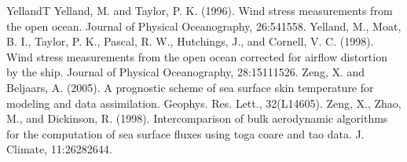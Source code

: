 \documentclass[letterpaper,10pt,english]{sphinxmanual}
\begin{document}
\begin{sphinxthebibliography}{YellandT}
\sphinxAtStartPar
Yelland, M. and Taylor, P. K. (1996). Wind stress measurements from the open ocean. Journal of Physical Oceanography, 26:541\textendash{}558.
\sphinxAtStartPar
Yelland, M., Moat, B. I., Taylor, P. K., Pascal, R. W., Hutchings, J., and Cornell, V. C. (1998). Wind stress measurements from the open ocean corrected for airflow distortion by the ship. Journal of Physical Oceanography, 28:1511\textendash{}1526.
\sphinxAtStartPar
Zeng, X. and Beljaars, A. (2005). A prognostic scheme of sea surface skin temperature for modeling and data assimilation. Geophys. Res. Lett., 32(L14605).
\sphinxAtStartPar
Zeng, X., Zhao, M., and Dickinson, R. (1998). Intercomparison of bulk aerodynamic algorithms for the computation of sea surface fluxes using toga coare and tao data. J. Climate, 11:2628\textendash{}2644.
\end{sphinxthebibliography}


\renewcommand{\indexname}{Python Module Index}
\begin{sphinxtheindex}
\let\bigletter\sphinxstyleindexlettergroup
\bigletter{a}
\item\relax{}
\indexspace
\bigletter{c}
\item\relax{}
\indexspace
\bigletter{f}
\item\relax{}
\indexspace
\bigletter{h}
\item\relax{}
\indexspace
\bigletter{u}
\item\relax{}
\end{sphinxtheindex}

\renewcommand{\indexname}{Index}
\printindex
\end{document}
